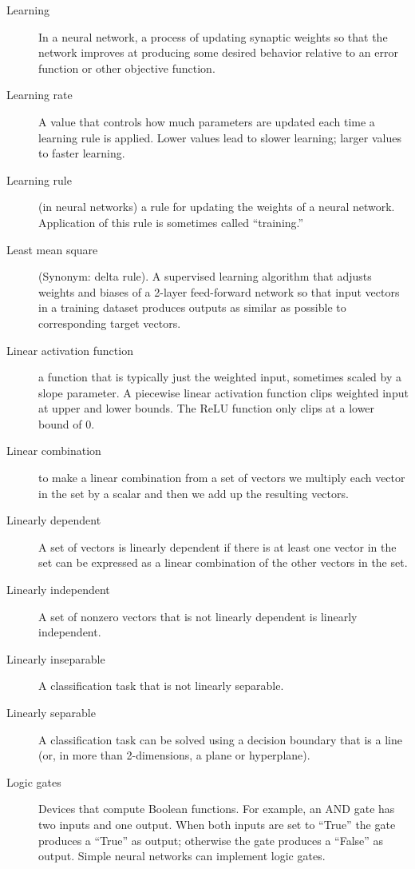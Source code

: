 \begin{description}
\item[Learning] In a neural network, a process of updating synaptic weights so that the network improves at producing some desired behavior relative to an error function or other objective function.

\item[Learning rate] A value that controls how much parameters are updated each time a learning rule is applied. Lower values lead to slower learning; larger values to faster learning.

\item[Learning rule] (in neural networks) a rule for updating the weights of a neural network. Application of this rule is sometimes called ``training.''

\item[Least mean square] (Synonym: delta rule). A supervised learning algorithm that adjusts weights and biases of a 2-layer feed-forward network so that input vectors in a training dataset produces outputs as similar as possible to corresponding target vectors.

\item[Linear activation function] a function that is typically just the weighted input, sometimes scaled by a slope parameter. A piecewise linear activation function clips weighted input at  upper and lower bounds. The ReLU function only clips at a lower bound of 0.

\item[Linear combination] to make a linear combination from a set of vectors we multiply each vector in the set by a scalar and then we add up the resulting vectors.

\item[Linearly dependent] A set of vectors is linearly dependent if there is at least one vector in the set can be expressed as a linear combination of the other vectors in the set.

\item[Linearly independent] A set of nonzero vectors that is not linearly
dependent is linearly independent.

\item[Linearly inseparable] A classification task that is not linearly separable.

\item[Linearly separable] A classification task can be solved using a decision boundary that is a line (or, in more than 2-dimensions, a plane or hyperplane).

\item[Logic gates] Devices that compute Boolean functions. For example, an AND gate has two inputs and one output. When both inputs are set to ``True'' the gate produces a ``True'' as output; otherwise the gate produces a ``False'' as output. Simple neural networks can implement logic gates.


\end{description}
